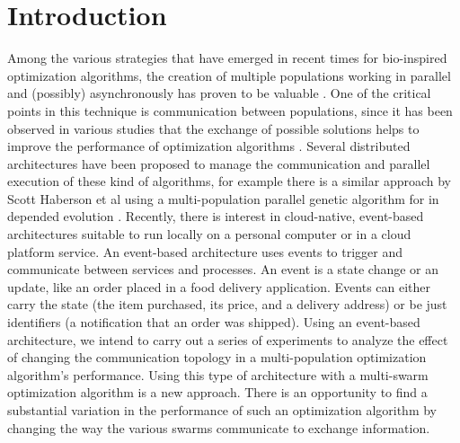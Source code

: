 \documentclass[runningheads]{llncs}
\begin{document}
\section{Introduction}


Among the various strategies that have emerged in recent times for bio-inspired
optimization algorithms, the creation of multiple populations working
in parallel and (possibly) asynchronously has proven to be valuable \cite{a1}.
One of the critical points in this technique is communication between
populations, since it has been observed in various studies that the
exchange of possible solutions helps to improve the performance of
optimization algorithms \cite{a2}.
Several distributed architectures have been proposed to manage the communication and parallel execution of these kind of algorithms, for example there is a similar approach by Scott Haberson et al using a multi-population parallel genetic algorithm for in depended evolution \cite{da1}.
Recently, there is interest in cloud-native, event-based architectures
suitable to run locally on a personal computer or in a cloud platform
service.
An event-based architecture uses events to trigger and communicate
between services and processes. An event is a state change or an
update, like an order placed in a food delivery application. Events
can either carry the state (the item purchased, its price, and a
delivery address) or be just identifiers (a notification that an order
was shipped). Using an event-based architecture, we intend to carry
out a series of experiments to analyze the effect of changing the
communication topology in a multi-population optimization algorithm's
performance. Using this type of architecture with a multi-swarm
optimization algorithm is a new approach. There is an opportunity to
find a substantial variation in the performance of such an
optimization algorithm by changing the way the various swarms
communicate to exchange information.
\end{document}
